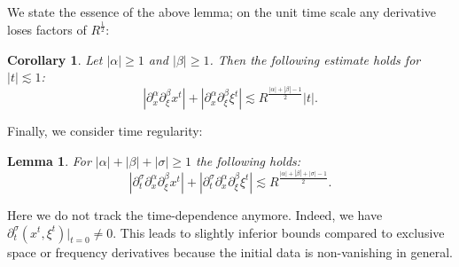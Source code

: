 \documentclass{amsart}
\newtheorem{corollary}[theorem]{Corollary}
\newtheorem{lemma}[theorem]{Lemma}
\theoremstyle{definition}
\begin{document}
We state the essence of the above lemma; on the unit time scale any derivative loses factors of $R^{\frac{1}{2}}$:
\begin{corollary}
Let $|\alpha| \geq 1$ and $|\beta| \geq 1$. Then the following estimate holds for $|t| \lesssim 1$:
\begin{equation*}
|\partial_x^{\alpha} \partial_{\xi}^{\beta} x^t| + |\partial_x^{\alpha} \partial_{\xi}^{\beta} \xi^t| \lesssim R^{\frac{|\alpha|+|\beta|-1}{2}} |t|.
\end{equation*}
\end{corollary}

Finally, we consider time regularity:
\begin{lemma}
\label{lem:TimeRegularityHamiltonFlow}
For $|\alpha| + |\beta| + |\sigma| \geq 1$ the following holds:
\begin{equation}
\label{eq:TimeRegularityHamiltonFlow}
|\partial_t^{\sigma} \partial_x^{\alpha} \partial_{\xi}^{\beta} x^t | + |\partial_t^{\sigma} \partial_x^{\alpha} \partial_{\xi}^{\beta} \xi^t | \lesssim R^{\frac{|\alpha| + |\beta| + |\sigma| -1}{2}}.
\end{equation}
\end{lemma}
Here we do not track the time-dependence anymore. Indeed, we have \\
 $\partial_t^{\sigma}(x^t,\xi^t) \big\vert_{t = 0} \neq 0$. This leads to slightly inferior bounds compared to exclusive space or frequency derivatives because the initial data is non-vanishing in general.
\end{document}
